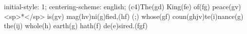 initial-style: 1;
centering-scheme: english;
(c4)The(gd) King(fe) of(fg) peace(gv) <sp>*</sp> is(gv) mag(hv)ni(g)fied,(hf) (;) whose(gf) coun(ghjv)te(i)nance(g) the(ij) whole(h) earth(g) hath(f) de(e)sired.(fgf)
